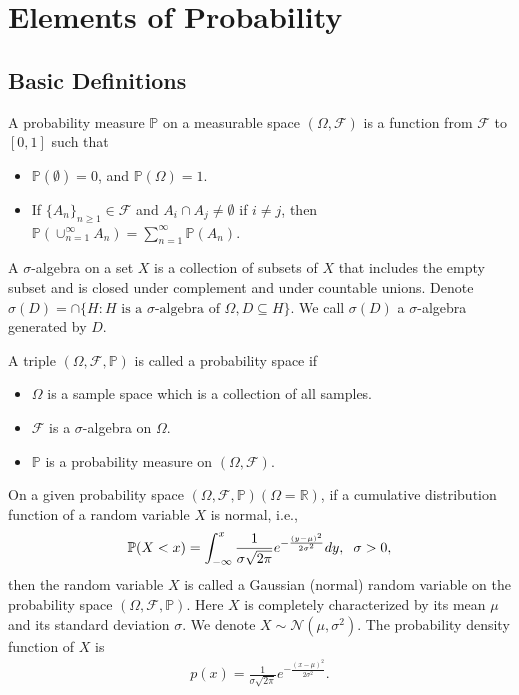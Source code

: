 \chapter{Elements of Probability}
\label{Appendix_A}
\section{Basic Definitions}
	\begin{definition}
		A probability measure $\mathbb{P}$ on a measurable space $(\Omega, \mathcal{F})$ is a function from $\mathcal{F}$ to $[0, 1]$ such that
			\begin{itemize}
				\item
				$\mathbb{P} (\emptyset) = 0$, and $\mathbb{P} (\Omega) = 1$.
				\item 
				If $\{ A_n \}_{n \geq 1} \in \mathcal{F}$ and $A_i \cap A_j \neq \emptyset$ if $i \neq j$, then $\mathbb{P} (\cup^{\infty}_{n=1} A_n) = \sum^{\infty}_{n = 1} \mathbb{P} (A_n)$.
			\end{itemize}	
	\end{definition}
	
	\noindent A $\sigma$-algebra on a set $X$ is a collection of subsets of $X$ that includes the empty subset and is closed under complement and under countable unions. Denote $\sigma (D) = \cap \{ H : H \text{ is a } \sigma \text{-algebra of } \Omega, D \subseteq H \}$. We call $\sigma (D)$ a $\sigma$-algebra generated by $D$.
	
	\begin{definition}
		A triple  $(\Omega, \mathcal{F}, \mathbb{P})$ is called a probability space if
		\begin{itemize}
			\item
			$\Omega$ is a sample space which is a collection of all samples.
			\item 
			$\mathcal{F}$ is a $\sigma$-algebra on $\Omega$.
			\item
			$\mathbb{P}$ is a probability measure on $(\Omega, \mathcal{F})$. 
		\end{itemize}	
	\end{definition}

	\noindent On a given probability space $(\Omega, \mathcal{F}, \mathbb{P}) (\Omega = \mathbb{R})$, if a cumulative distribution function of a random variable $X$ is normal, i.e.,
	\begin{align}
		\mathbb{P} (X < x) = \displaystyle \int_{-\infty}^{x} \frac{1}{ \sigma \sqrt{2 \pi} } e^{-\frac{(y - \mu)^2}{2 \sigma^2}} dy, \hspace{2mm} \sigma > 0,
	\end{align}
	then the random variable $X$ is called a Gaussian (normal) random variable on the probability space $(\Omega, \mathcal{F}, \mathbb{P})$. Here $X$ is completely characterized by its mean $\mu$ and its standard deviation $\sigma$. We denote $X \sim \mathcal{N} (\mu, \sigma^2)$. The probability density function of $X$ is
	\begin{align*}
		p(x) = \frac{1}{\sigma \sqrt{2 \pi}} e^{-\frac{(x - \mu)^2}{2 \sigma^2}}.
	\end{align*}

